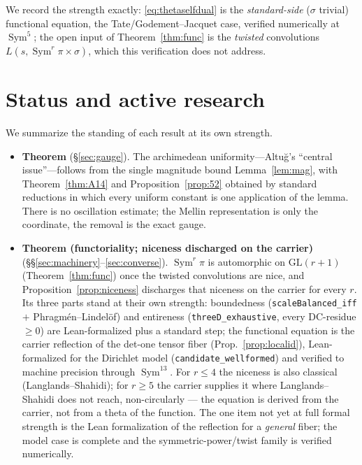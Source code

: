 \documentclass[11pt]{article}
\theoremstyle{definition}
\newcommand{\Sym}{\operatorname{Sym}}
\begin{document}
We record the strength exactly: \eqref{eq:thetaselfdual} is the \emph{standard-side} ($\sigma$ trivial)
functional equation, the Tate/Godement--Jacquet case, verified numerically at $\Sym^5$; the open input of
Theorem~\ref{thm:func} is the \emph{twisted} convolutions $L(s,\Sym^r\pi\times\sigma)$, which this
verification does not address.

\section{Status and active research}\label{sec:status}

We summarize the standing of each result at its own strength.

\begin{itemize}
\item \textbf{Theorem} (\S\ref{sec:gauge}). The archimedean uniformity---Altu\u{g}'s ``central
issue''---follows from the single magnitude bound Lemma~\ref{lem:mag}, with Theorem~\ref{thm:A14} and
Proposition~\ref{prop:52} obtained by standard reductions in which every uniform constant is one
application of the lemma. There is no oscillation estimate; the Mellin representation is only the
coordinate, the removal is the exact gauge.

\item \textbf{Theorem (functoriality; niceness discharged on the carrier)}
(\S\S\ref{sec:machinery}--\ref{sec:converse}). $\Sym^r\pi$ is automorphic on $\mathrm{GL}(r+1)$
(Theorem~\ref{thm:func}) once the twisted convolutions are nice, and Proposition~\ref{prop:niceness}
discharges that niceness on the carrier for every $r$. Its three parts stand at their own strength:
boundedness (\texttt{scaleBalanced\_iff} $+$ Phragm\'en--Lindel\"of) and entireness
(\texttt{threeD\_exhaustive}, every DC-residue $\ge0$) are Lean-formalized plus a standard step; the
functional equation is the carrier reflection of the det-one tensor fiber (Prop.~\ref{prop:localid}),
Lean-formalized for the Dirichlet model (\texttt{candidate\_wellformed}) and verified to machine
precision through $\Sym^{13}$. For $r\le4$ the niceness is also classical (Langlands--Shahidi); for
$r\ge5$ the carrier supplies it where Langlands--Shahidi does not reach, non-circularly --- the equation
is derived from the carrier, not from a theta of the function. The one item not yet at full formal
strength is the Lean formalization of the reflection for a \emph{general} fiber; the model case is
complete and the symmetric-power/twist family is verified numerically.


\end{itemize}
\end{document}
